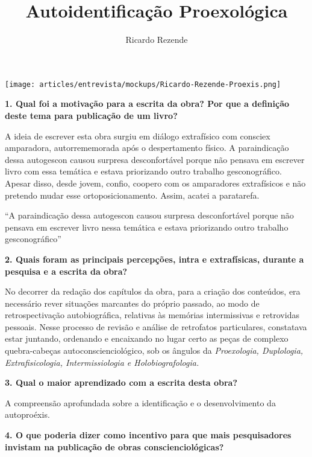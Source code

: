 \documentclass{gescons}
\author{Ricardo Rezende}
\title{Autoidentificação Proexológica}
\begin{document}
    \makeentrevistatitle

    \begin{multicols}{2}


\begin{center}
    \texttt{[image: articles/entrevista/mockups/Ricardo-Rezende-Proexis.png]}
\end{center}

\textbf{1. Qual foi a motivação para a escrita da obra? Por que a definição deste tema para publicação de um livro? }

A ideia de escrever esta obra surgiu em diálogo extrafísico com consciex amparadora, autorrememorada após o despertamento físico. A paraindicação dessa autogescon causou surpresa desconfortável porque não pensava em escrever livro com essa temática e estava priorizando outro trabalho gesconográfico. Apesar disso, desde jovem, confio, coopero com os amparadores extrafísicos e não pretendo mudar esse ortoposicionamento. Assim, acatei a paratarefa.

\begin{pullquote}
    ``A paraindicação dessa autogescon causou surpresa desconfortável porque não pensava em escrever livro nessa temática e estava priorizando outro trabalho gesconográfico''
\end{pullquote}

\textbf{2. Quais foram as principais percepções, intra e extrafísicas, durante a pesquisa e a escrita da obra? }

No decorrer da redação dos capítulos da obra, para a criação dos conteúdos, era necessário rever situações marcantes do próprio passado, ao modo de retrospectivação autobiográfica, relativas às memórias intermissivas e retrovidas pessoais. Nesse processo de revisão e análise de retrofatos particulares, constatava estar juntando, ordenando e encaixando no lugar certo as peças de complexo quebra-cabeças autoconscienciológico, sob os ângulos da \textit{Proexologia, Duplologia, Extrafisicologia, Intermissiologia e Holobiografologia.}

\textbf{3. Qual o maior aprendizado com a escrita desta obra? }

A compreensão aprofundada sobre a identificação e o desenvolvimento da autoproéxis.

\textbf{4. O que poderia dizer como incentivo para que mais pesquisadores invistam na publicação de obras conscienciológicas?}


\end{multicols}
\end{document}

